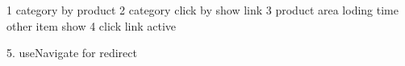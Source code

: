 1 category by product 
2 category click by show link 
3 product area loding time other item show 
4 click link active

5. useNavigate for redirect